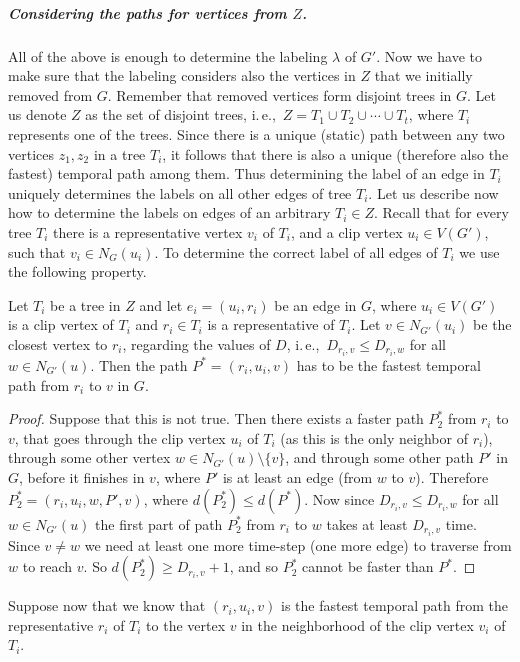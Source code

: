 \documentclass[a4paper,UKenglish,cleveref, autoref, thm-restate]{lipics-v2021}
\newcommand{\ie}{i.\,e.,\ }
\begin{document}
\subparagraph{\boldmath Considering the paths for vertices from $Z$.}
All of the above is enough to determine the labeling $\lambda$ of $G'$. Now we have to make sure that the labeling considers also the vertices in $Z$ that we initially removed from $G$.
Remember that removed vertices form disjoint trees in $G$.
Let us denote $Z$ as the set of disjoint trees, \ie $Z = T_1 \cup T_2 \cup \cdots \cup T_t$, where $T_i$ represents one of the trees.
Since there is a unique (static) path between any two vertices $z_1, z_2$ in a tree $T_i$,
it follows that there is also a unique (therefore also the fastest) temporal path among them.
Thus determining the label of an edge in $T_i$ uniquely determines the labels on all other edges of tree $T_i$.
Let us describe now how to determine the labels on edges of an arbitrary $T_i \in Z$.
Recall that for every tree $T_i$ there is a representative vertex $v_i$ of $T_i$,
and a clip vertex $u_i \in V(G')$, such that $v_i \in N_G(u_i)$.
To determine the correct label of all edges of $T_i$ we use the following property.
\begin{lemma}
Let $T_i$ be a tree in $Z$ and let $e_i = (u_i,r_i)$ be an edge in $G$, where $u_i \in V(G')$ is a clip vertex of $T_i$ and $r_i \in T_i$ is a representative of $T_i$.
Let $v \in N_{G'}(u_i)$ be the closest vertex to $r_i$, regarding the values of $D$, \ie  $D_{r_i,v} \leq D_{r_i,w}$ for all $w \in N_{G'}(u)$.
Then the path $P^*=(r_i,u_i,v)$ has to be the fastest temporal path from $r_i$ to $v$ in $G$.
\end{lemma}
\begin{proof}
Suppose that this is not true.
Then there exists a faster path $P^*_2$ from $r_i$ to $v$, that goes through the clip vertex $u_i$ of $T_i$ (as this is the only neighbor of $r_i$), through some other vertex $w \in N_{G'}(u) \setminus \{v \}$, 
and through some other path $P'$ in $G$, before it finishes in $v$, where $P'$ is at least an edge (from $w$ to $v$). 
Therefore $P^*_2= (r_i,u_i,w,P',v)$, where $d(P^*_2) \leq d(P^*)$.
Now since $D_{r_i,v} \leq D_{r_i,w}$ for all $ w\in N_{G'}(u)$ the first part of path $P^*_2$ from $r_i$ to $w$ takes at least $D_{r_i,v}$ time.
Since $v \neq w$ we need at least one more time-step (one more edge) to traverse from $w$ to reach $v$. 
So $d(P^*_2) \geq D_{r_i,v} + 1$, and so $P^*_2$ cannot be faster than $P^*$.
\end{proof}
Suppose now that we know that 
$(r_i,u_i,v)$ is the fastest temporal path from the representative $r_i$ of $T_i$ to the vertex $v$ in the neighborhood of the clip vertex $v_i$ of $T_i$.
\end{document}

